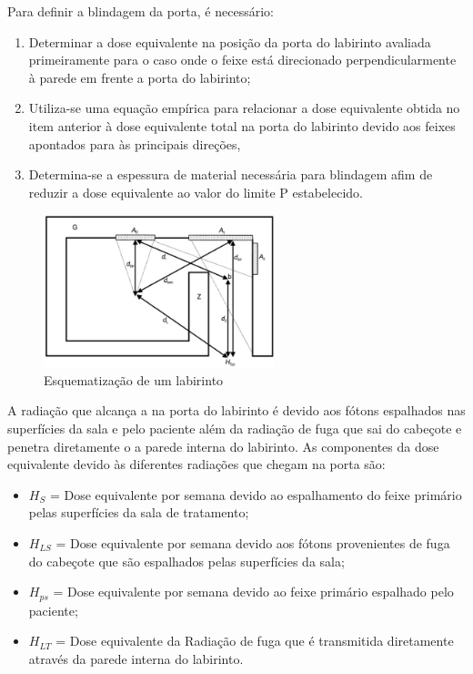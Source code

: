 \documentclass[11pt,a4paper]{article}
\begin{document}
            Para definir a blindagem da porta, é necessário:

            \begin{enumerate}
                \item Determinar a dose equivalente na posição da porta do labirinto avaliada primeiramente para o caso onde o feixe está direcionado perpendicularmente à parede em frente a porta do labirinto;
                \item Utiliza-se uma equação empírica para relacionar a dose equivalente obtida no item anterior à dose equivalente total na porta do labirinto devido aos feixes apontados para às principais direções, 
                \item Determina-se a espessura de material necessária para blindagem afim de reduzir a dose equivalente ao valor do limite P estabelecido.
            \end{enumerate}

            \begin{figure}[h]
                \centering
                \includegraphics[width=0.6\textwidth]{Imagens/esquemaLabirinto.JPG}
                \caption{Esquematização de um labirinto}
                \label{fig:esquemaLabirinto}
            \end{figure}

            A radiação que alcança a na porta do labirinto é devido aos fótons espalhados nas superfícies da sala e pelo paciente além da radiação de fuga que sai do cabeçote e penetra diretamente o a parede interna do labirinto. As componentes da dose equivalente devido às diferentes radiações que chegam na porta são:

            \begin{itemize}
                \item $H_S$ = Dose equivalente por semana devido ao espalhamento do feixe primário pelas superfícies da sala de tratamento;
                \item $H_{LS}$ = Dose equivalente por semana devido aos fótons provenientes de fuga do cabeçote que são espalhados pelas superfícies da sala;
                \item $H_{ps}$ = Dose equivalente por semana devido ao feixe primário espalhado pelo paciente;
                \item $H_{LT}$ = Dose equivalente da Radiação de fuga que é transmitida diretamente através da parede interna do labirinto.
            \end{itemize}
\end{document}
